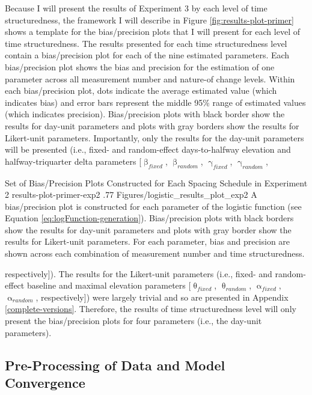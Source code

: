 \documentclass[
12pt, %
twoside,
english]{guelphthesis}
\begin{document}
Because I will present the results of Experiment 3 by each level of time structuredness, the framework I will describe in Figure \ref{fig:results-plot-primer} shows a template for the bias/precision plots that I will present for each level of time structuredness. The results presented for each time structuredness level contain a bias/precision plot for each of the nine estimated parameters. Each bias/precision plot shows the bias and precision for the estimation of one parameter across all measurement number and nature-of change levels. Within each bias/precision plot, dots indicate the average estimated value (which indicates bias) and error bars represent the middle 95\% range of estimated values (which indicates precision). Bias/precision plots with black border show the results for day-unit parameters and plots with gray borders show the results for Likert-unit parameters. Importantly, only the results for the day-unit parameters will be presented (i.e., fixed- and random-effect days-to-halfway elevation and halfway-triquarter delta parameters {[}\(\upbeta_{fixed}\), \(\upbeta_{random}\), \(\upgamma_{fixed}\), \(\upgamma_{random}\),
\begin{apaFigure}
[portrait]
[samepage]
[-0.2cm]
{Set of Bias/Precision Plots Constructed for Each Spacing Schedule in Experiment 2}
{results-plot-primer-exp2}
{.77}
{Figures/logistic_results_plot_exp2}
{A bias/precision plot is constructed for each parameter of the logistic function (see Equation \ref{eq:logFunction-generation}). Bias/precision plots with black borders show the results for day-unit parameters and plots with gray border show the results for Likert-unit parameters. For each parameter, bias and precision are shown across each combination of measurement number and time structuredness.}
\end{apaFigure}
\noindent respectively{]}). The results for the Likert-unit parameters (i.e., fixed- and random-effect baseline and maximal elevation parameters {[}\(\uptheta_{fixed}\), \(\uptheta_{random}\), \(\upalpha_{fixed}\), \(\upalpha_{random}\), respectively{]}) were largely trivial and so are presented in Appendix \ref{complete-versions}. Therefore, the results of time structuredness level will only present the bias/precision plots for four parameters (i.e., the day-unit parameters).

\hypertarget{pre-processing-of-data-and-model-convergence-2}{%
\subsection{Pre-Processing of Data and Model Convergence}\label{pre-processing-of-data-and-model-convergence-2}}
\end{document}
